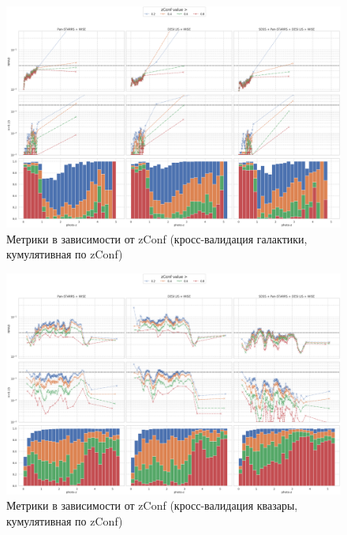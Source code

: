 \documentclass[fleqn,usenatbib]{mnras}
\begin{document}
\begin{figure}
    \centering
    \includegraphics[width=0.99\linewidth]{images/metrics-zconf-cv2-gal-log-cum.png}
    \caption{Метрики в зависимости от zConf (кросс-валидация галактики, кумулятивная по zConf)}
    \label{fig:metrics-zconf-cv2}
\end{figure}


\begin{figure}
    \centering
    \includegraphics[width=0.99\linewidth]{images/metrics-zconf-cv2-qso-log-cum.png}
    \caption{Метрики в зависимости от zConf (кросс-валидация квазары, кумулятивная по zConf)}
    \label{fig:metrics-zconf-cv2}
\end{figure}
\end{document}

